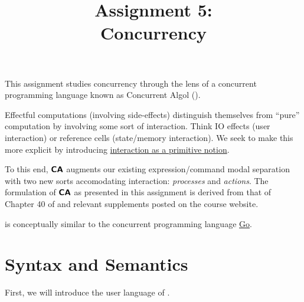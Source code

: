 \documentclass[11pt]{article}
\title{Assignment 5: \\
       Concurrency}
\begin{document}
\maketitle

This assignment studies concurrency through the lens of a concurrent programming language known as Concurrent Algol (\LangCA{}).

Effectful computations (involving side-effects) distinguish themselves from ``pure'' computation by involving some sort of interaction. Think IO effects (user interaction)
or reference cells (state/memory interaction). We seek to make this more explicit by introducing \underline{interaction as a primitive notion}.

To this end, $\textbf{\textsf{CA}}{}$ augments our existing expression/command modal separation with two new sorts accomodating interaction: \textit{processes} and \textit{actions}. The formulation of $\textbf{\textsf{CA}}{}$ as presented in this assignment is derived from that of Chapter 40 of \PFPL and relevant supplements posted on the course website.

\LangCA{} is conceptually similar to the concurrent programming language \href{https://go.dev/}{Go}.


\section{Syntax and Semantics}\label{sec:syn-sem}

First, we will introduce the user language of \LangCA{}.
\end{document}
